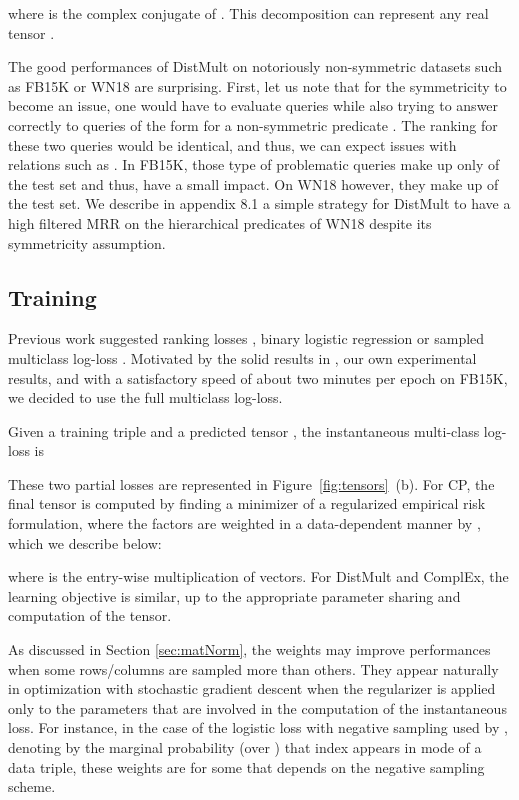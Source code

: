 \documentclass{article}
\newcommand{\CP}{{CP}\xspace}
\newcommand{\complex}{{ComplEx}\xspace}
\newcommand{\distmult}{{DistMult}\xspace}
\newcommand{\fb}{{FB15K}\xspace}
\newcommand{\wn}{{WN18}\xspace}
\begin{document}
where  is the complex conjugate of . This decomposition can represent any real tensor \citep{trouillon_complex_2016}.

The good performances of \distmult on notoriously non-symmetric datasets such as \fb or \wn are surprising. First, let us note that for the symmetricity to become an issue, one would have to evaluate queries  while also trying to answer correctly to queries of the form  for a non-symmetric predicate . The ranking for these two queries would be identical, and thus, we can expect issues with relations such as . In \fb, those type of problematic queries make up only  of the test set and thus, have a small impact. On \wn however, they make up  of the test set. We describe in appendix 8.1 a simple strategy for \distmult to have a high filtered MRR on the hierarchical predicates of \wn despite its symmetricity assumption.


\subsection{Training}
Previous work suggested ranking losses \citep{bordes_translating_2013}, binary logistic regression \citep{trouillon_complex_2016} or sampled multiclass log-loss \citep{kadlec_knowledge_2017}. Motivated by the solid results in \citet{joulin2017fast}, our own experimental results, and with a satisfactory speed of about two minutes per epoch on \fb, we decided to use the full multiclass log-loss. 

Given a training triple  and a predicted tensor , the instantaneous multi-class log-loss  is

These two partial losses are represented in Figure~\ref{fig:tensors}~(b).
For \CP, the final tensor is computed by finding a minimizer of a regularized empirical risk formulation, where the factors  are weighted in a data-dependent manner by , which we describe below: 

where  is the entry-wise multiplication of vectors. 
For \distmult and \complex, the learning objective is similar, up to the appropriate parameter sharing and computation of the tensor.

As discussed in Section \ref{sec:matNorm}, the weights  may improve performances when some rows/columns are sampled more than others. They appear naturally in optimization with stochastic gradient descent when the regularizer is applied only to the parameters that are involved in the computation of the instantaneous loss. For instance, in the case of the logistic loss with negative sampling used by \citet{trouillon_complex_2016}, denoting by  the marginal probability (over ) that index  appears in mode  of a data triple, these weights are  for some  that depends on the negative sampling scheme.
\end{document}
